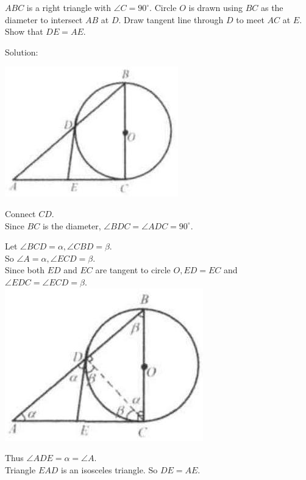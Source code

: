 \documentclass{article}
\begin{document}
\(A B C\) is a right triangle with \(\angle C=90^{\circ}\). Circle \(O\) is drawn using \(B C\) as the diameter to intersect \(A B\) at \(D\). Draw tangent line through \(D\) to meet \(A C\) at \(E\). Show that \(D E=A E\).

Solution:
\begin{center}
\includegraphics[width=\textwidth]{images/163(3).jpg}
\end{center}

Connect \(C D\).\\
Since \(B C\) is the diameter, \(\angle B D C=\angle A D C=90^{\circ}\).


Let \(\angle B C D=\alpha, \angle C B D=\beta\).\\
So \(\angle A=\alpha, \angle E C D=\beta\).\\
Since both \(E D\) and \(E C\) are tangent to circle \(O, E D=E C\) and \(\angle E D C=\angle E C D=\beta\).\\
\centering
\includegraphics[width=\textwidth]{images/164.jpg}

Thus \(\angle A D E=\alpha=\angle A\).\\
Triangle \(E A D\) is an isosceles triangle. So \(D E=A E\).\\
\end{document}
